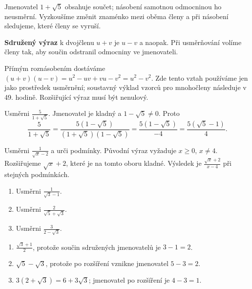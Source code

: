 \documentclass[11pt,a4paper]{article}
\begin{document}

Jmenovatel $1+\sqrt5$ obsahuje součet; násobení samotnou odmocninou ho neusměrní. Vyzkoušíme změnit znaménko mezi oběma členy a při násobení sledujeme, které členy se vyruší.

\begin{definiceBox}[title={Definice},breakable=false]
\textbf{Sdružený výraz} k dvojčlenu $u+v$ je $u-v$ a naopak. Při usměrňování volíme členy tak, aby součin odstranil odmocniny ve jmenovateli.
\end{definiceBox}


Přímým roznásobením dostáváme $(u+v)(u-v)=u^2-uv+vu-v^2=u^2-v^2$. Zde tento vztah používáme jen jako prostředek usměrnění; soustavný výklad vzorců pro mnohočleny následuje v 49. hodině. Rozšiřující výraz musí být nenulový.


\begin{prikladReseniBox}[title={Příklad 1},breakable=false]
Usměrni $\frac5{1+\sqrt5}$.
\tcblower
Jmenovatel je kladný a $1-\sqrt5\ne0$. Proto
\[\frac5{1+\sqrt5}=\frac{5(1-\sqrt5)}{(1+\sqrt5)(1-\sqrt5)}=\frac{5(1-\sqrt5)}{-4}=\frac{5(\sqrt5-1)}4.\]
\end{prikladReseniBox}


\begin{prikladReseniBox}[title={Příklad 2},breakable=false]
Usměrni $\frac1{\sqrt x-2}$ a urči podmínky.
\tcblower
Původní výraz vyžaduje $x\ge0$, $x\ne4$. Rozšiřujeme $\sqrt x+2$, které je na tomto oboru kladné. Výsledek je $\frac{\sqrt x+2}{x-4}$ při stejných podmínkách.
\end{prikladReseniBox}



\begin{zadaniReseniBox}[title={Procvičení},breakable=false]
\begin{enumerate}[label=\alph*)]
\item Usměrni $\frac1{\sqrt3-1}$.
\item Usměrni $\frac2{\sqrt5+\sqrt3}$.
\item Usměrni $\frac3{2-\sqrt3}$.
\end{enumerate}
\tcblower
\begin{enumerate}[label=\alph*)]
\item $\frac{\sqrt3+1}{2}$, protože součin sdružených jmenovatelů je $3-1=2$.
\item $\sqrt5-\sqrt3$, protože po rozšíření vznikne jmenovatel $5-3=2$.
\item $3(2+\sqrt3)=6+3\sqrt3$; jmenovatel po rozšíření je $4-3=1$.
\end{enumerate}
\end{zadaniReseniBox}
\end{document}
